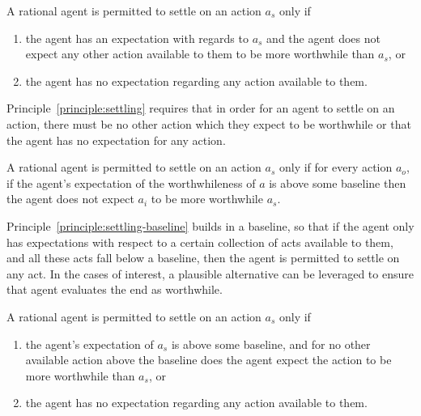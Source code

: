 \documentclass[10pt]{article}
\begin{document}
\begin{principle}[Settling]\label{principle:settling}
  A rational agent is permitted to settle on an action \(a_{s}\) only if
  \begin{enumerate}[noitemsep]
  \item the agent has an expectation with regards to \(a_{s}\) and the agent does not expect any other action available to them to be more worthwhile than \(a_{s}\), or
  \item the agent has no expectation regarding any action available to them.
  \end{enumerate}
\end{principle}

Principle~\ref{principle:settling} requires that in order for an agent to settle on an action, there must be no other action which they expect to be worthwhile or that the agent has no expectation for any action.

\begin{principle}\label{principle:settling-baseline}
  A rational agent is permitted to settle on an action \(a_{s}\) only if for every action \(a_{o}\), if the agent's expectation of the worthwhileness of \(a\) is above some baseline then the agent does not expect \(a_{i}\) to be more worthwhile \(a_{s}\).
\end{principle}

Principle~\ref{principle:settling-baseline} builds in a baseline, so that if the agent only has expectations with respect to a certain collection of acts available to them, and all these acts fall below a baseline, then the agent is permitted to settle on any act.
In the cases of interest, a plausible alternative can be leveraged to ensure that agent evaluates the end as worthwhile.

\begin{principle}[Settling]\label{principle:settling}
  A rational agent is permitted to settle on an action \(a_{s}\) only if
  \begin{enumerate}[noitemsep]
  \item the agent's expectation of \(a_{s}\) is above some baseline, and for no other available action above the baseline does the agent expect the action to be more worthwhile than \(a_{s}\), or
  \item the agent has no expectation regarding any action available to them.
  \end{enumerate}
\end{principle}
\end{document}
